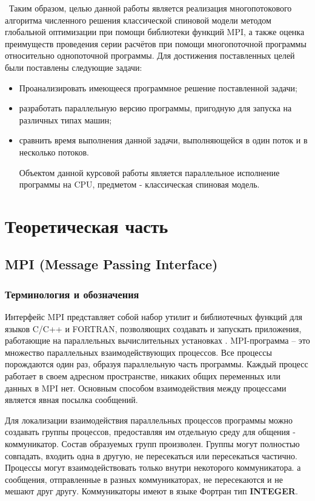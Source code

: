 \documentclass[14pt,a4paper,report]{ncc}
\begin{document}
\
Таким образом, целью данной работы является реализация многопотокового алгоритма численного решения классической спиновой модели методом глобальной оптимизации при помощи библиотеки функций MPI, а также оценка преимуществ проведения серии расчётов при помощи многопоточной программы относительно однопоточной программы. Для достижения поставленных целей были поставлены следующие задачи:
\begin{itemize}
\item Проанализировать имеющееся программное решение поставленной задачи;
\item разработать параллельную версию программы, пригодную для запуска на различных типах машин;
\item сравнить время выполнения данной задачи, выполняющейся в один поток и в несколько потоков.
\

Объектом данной курсовой работы является параллельное исполнение программы на CPU, предметом - классическая спиновая модель.
\end{itemize} 

\chapter*{Теоретическая часть}

\section{MPI (Message Passing Interface)}
\subsection{Терминология и обозначения}
Интерфейс MPI представляет собой набор утилит и библиотечных функций для языков C/C++ и FORTRAN, позволяющих создавать и запускать приложения, работающие на параллельных вычислительных установках \cite{Bogachev}.
MPI-программа -- это множество параллельных взаимодействующих процессов. Все процессы порождаются один раз, образуя параллельную часть программы. Каждый процесс работает в своем адресном пространстве, никаких общих переменных или данных в MPI нет. Основным способом взаимодействия между процессами является явная посылка сообщений. 
\

Для локализации взаимодействия параллельных процессов программы можно создавать группы процессов, предоставляя им отдельную среду для общения - коммуникатор. Состав образуемых групп произволен. Группы могут полностью совпадать, входить одна в другую, не пересекаться или пересекаться частично. Процессы могут взаимодействовать только внутри некоторого коммуникатора. а сообщения, отправленные в разных коммуникаторах, не пересекаются и не мешают друг другу. Коммуникаторы имеют в языке Фортран тип \textbf{INTEGER}. 
\
\end{document}
